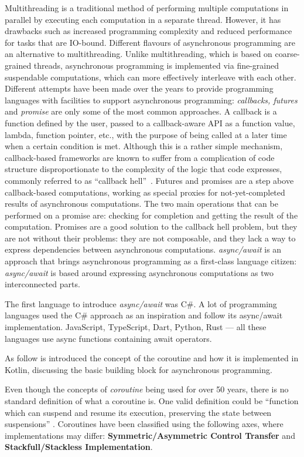 Multithreading is a traditional method of performing multiple computations in parallel by executing each computation in a separate thread. However,
it has drawbacks such as increased programming complexity and reduced performance for tasks that are IO-bound.
Different flavours of asynchronous programming are an alternative to multithreading. Unlike multithreading, which is based on coarse-grained threads,
asynchronous programming is implemented via fine-grained suspendable computations, which can more effectively interleave with each other.
Different attempts have been made over the years to provide programming languages with facilities to support asynchronous programming:
\emph{callbacks, futures} and \emph{promise} are only some of the most common approaches.
A callback is a function defined by the user, passed to a callback-aware API as a function value, lambda, function pointer, etc., with the purpose of
being called at a later time when a certain condition is met. Although this is a rather simple mechanism, callback-based frameworks are known to
suffer from a complication of code structure disproportionate to the complexity of the logic that code expresses, commonly referred to as ``callback
hell''~\cite{7321196}. Futures and promises are a step above callback-based computations, working as special proxies for not-yet-completed results
of asynchronous computations. The two main operations that can be performed on a promise are: checking for completion and getting the result of the
computation. Promises are a good solution to the callback hell problem, but they are not without their problems: they are not composable, and they
lack a way to express dependencies between asynchronous computations. \emph{async/await} is an approach that brings asynchronous programming as a
first-class language citizen: \emph{async/await} is based around expressing asynchronous computations as two interconnected parts.

The first language to introduce \emph{async/await} was C\#. A lot of programming languages used the C\# approach as an inspiration and follow its
async/await implementation. JavaScript, TypeScript, Dart, Python, Rust — all these languages use async functions containing await operators.

As follow is introduced the concept of the coroutine and how it is implemented in Kotlin, discussing the basic building block for asynchronous
programming.

Even though the concepts of \emph{coroutine} being used for over 50 years, there is no standard definition of what a coroutine is.
One valid definition could be ``function which can suspend and resume its execution, preserving the state between suspensions''
\cite{elizarov2021kotlin}. Coroutines have been classified using the following axes, where implementations may differ:
\textbf{Symmetric/Asymmetric Control Transfer} and \textbf{Stackfull/Stackless Implementation}.

